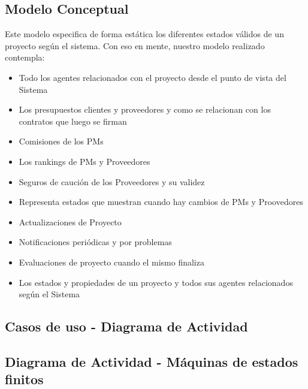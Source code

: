 \subsection{Modelo Conceptual}

Este modelo especifica de forma estática los diferentes estados válidos de un proyecto según el sistema. Con eso en mente, nuestro modelo realizado contempla:

\begin{itemize}
	\item Todo los agentes relacionados con el proyecto desde el punto de vista del Sistema
	\item Los presupuestos clientes y proveedores y como se relacionan con los contratos que luego se firman
	\item Comisiones de los PMs
	\item Los rankings de PMs y Proveedores
	\item Seguros de caución de los Proveedores y su validez
	\item Representa estados que muestran cuando hay cambios de PMs y Proovedores
	\item Actualizaciones de Proyecto
	\item Notificaciones periódicas y por problemas
	\item Evaluaciones de proyecto cuando el mismo finaliza
	\item Los estados y propiedades de un proyecto y todos sus agentes relacionados según el Sistema
\end{itemize}

\subsection{Casos de uso - Diagrama de Actividad}

\subsection{Diagrama de Actividad - Máquinas de estados finitos}
